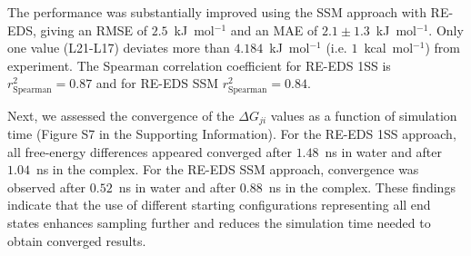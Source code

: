 The performance was substantially improved using the SSM approach with RE-EDS, giving an RMSE of $2.5$~kJ~mol$^{-1}$ and an MAE of $2.1 \pm 1.3$~kJ~mol$^{-1}$. 
Only one value (L21-L17) deviates more than $4.184$~kJ~mol$^{-1}$ (i.e. $1$~kcal~mol$^{-1}$) from experiment.
The Spearman correlation coefficient for RE-EDS 1SS is $r^2_{\text{Spearman}}=0.87$ and for RE-EDS SSM $r^2_{\text{Spearman}}=0.84$.

Next, we assessed the convergence of the $\Delta G_{ji}$ values as a function of simulation time (Figure S7 in the Supporting Information). %
For the RE-EDS 1SS approach, all free-energy differences appeared converged after $1.48$~ns in water and after $1.04$~ns in the complex. For the RE-EDS SSM approach, convergence was observed after $0.52$~ns in water and after $0.88$~ns in the complex. These findings indicate that the use of different starting configurations representing all end states enhances sampling further and reduces the simulation time needed to obtain converged results.

